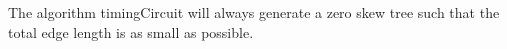 \documentclass[11pt]{scrartcl}
\begin{document}
	\iffalse
		\begin{lemma}
			If $L_\alpha = L_\phi$ and $R_\alpha = R_\phi$,	then $\ell^\alpha_{(v,l)} \leq \ell^\phi_{(v,l)}$ and
			$\ell^\alpha_{(v,r)} \leq \ell^\phi_{(v,r)}$.
		\end{lemma}
		\begin{proof}
			Consider the case when $\delta_l + \ell_{(v,l)} > \delta_r + \ell_{(v,r)}$.
			We show $\ell^\alpha_{(v,l)} \leq \ell^\phi_{(v,l)}$ and
			$\ell^\alpha_{(v,r)} \leq \ell^\phi_{(v,r)}$.
			Suppose for the sake of contradiction, $\ell^\alpha_{(v,l)} > \ell^\phi_{(v,l)}$.

		\end{proof}
	\fi
	\begin{theorem}
		The algorithm timingCircuit will always generate a zero skew tree such that the
		total edge length is as small as possible.
	\end{theorem}
\end{document}
